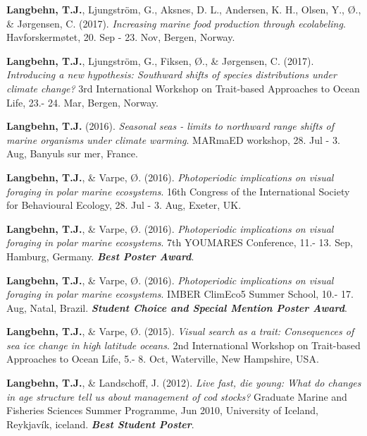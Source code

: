 \documentclass[11pt, a4paper]{awesome-cv}
\begin{document}
\leavevmode\hypertarget{ref-Langbehn8}{}%
\textbf{Langbehn, T.J.}, Ljungström, G., Aksnes, D. L., Andersen, K. H.,
Olsen, Y., Ø., \& Jørgensen, C. (2017). \emph{Increasing marine food
production through ecolabeling}. Havforskermøtet, 20. Sep - 23. Nov,
Bergen, Norway.

\leavevmode\hypertarget{ref-Langbehn7}{}%
\textbf{Langbehn, T.J.}, Ljungström, G., Fiksen, Ø., \& Jørgensen, C.
(2017). \emph{Introducing a new hypothesis: Southward shifts of species
distributions under climate change?} 3rd International Workshop on
Trait-based Approaches to Ocean Life, 23.- 24. Mar, Bergen, Norway.

\leavevmode\hypertarget{ref-Langbehn3}{}%
\textbf{Langbehn, T.J.} (2016). \emph{Seasonal seas - limits to
northward range shifts of marine organisms under climate warming}.
MARmaED workshop, 28. Jul - 3. Aug, Banyuls sur mer, France.

\leavevmode\hypertarget{ref-Langbehn4}{}%
\textbf{Langbehn, T.J.}, \& Varpe, Ø. (2016). \emph{Photoperiodic
implications on visual foraging in polar marine ecosystems}. 16th
Congress of the International Society for Behavioural Ecology, 28. Jul -
3. Aug, Exeter, UK.

\leavevmode\hypertarget{ref-Langbehn5}{}%
\textbf{Langbehn, T.J.}, \& Varpe, Ø. (2016). \emph{Photoperiodic
implications on visual foraging in polar marine ecosystems}. 7th
YOUMARES Conference, 11.- 13. Sep, Hamburg, Germany. \emph{\textbf{Best
Poster Award}}.

\leavevmode\hypertarget{ref-Langbehn6}{}%
\textbf{Langbehn, T.J.}, \& Varpe, Ø. (2016). \emph{Photoperiodic
implications on visual foraging in polar marine ecosystems}. IMBER
ClimEco5 Summer School, 10.- 17. Aug, Natal, Brazil.
\emph{\textbf{Student Choice and Special Mention Poster Award}}.

\leavevmode\hypertarget{ref-Langbehn2}{}%
\textbf{Langbehn, T.J.}, \& Varpe, Ø. (2015). \emph{Visual search as a
trait: Consequences of sea ice change in high latitude oceans}. 2nd
International Workshop on Trait-based Approaches to Ocean Life, 5.- 8.
Oct, Waterville, New Hampshire, USA.

\leavevmode\hypertarget{ref-Langbehn1}{}%
\textbf{Langbehn, T.J.}, \& Landschoff, J. (2012). \emph{Live fast, die
young: What do changes in age structure tell us about management of cod
stocks?} Graduate Marine and Fisheries Sciences Summer Programme, Jun
2010, University of Iceland, Reykjavík, iceland. \emph{\textbf{Best
Student Poster}}.
\end{document}
